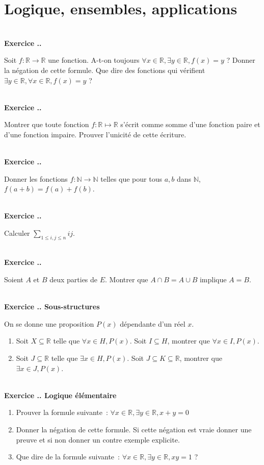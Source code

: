 \documentclass{article}
\newcommand{\mb}[1]{\mathbb{#1}}
\newcounter{exo}
\newcommand{\exercice}[1][\null]{\textbf{\\ \large Exercice \thesection.\theexo. \normalsize #1} \addtocounter{exo}{1}}
\begin{document}
\tableofcontents

\pagebreak


\section{Logique, ensembles, applications}

\exercice 

Soit $f : \mb{R} \rightarrow \mb{R}$ une fonction. A-t-on toujours $\forall x \in \mb{R}, \exists y \in \mb{R}, f(x) = y$ ? Donner la négation de cette formule. Que dire des fonctions qui vérifient $\exists y \in \mb{R}, \forall x \in \mb{R},  f(x) = y$ ?

\exercice  Montrer que toute fonction $f : \mb{R} \mapsto \mb{R}$ s'écrit comme somme d'une fonction paire et d'une fonction impaire. Prouver l'unicité de cette écriture.

\exercice Donner les fonctions $f : \mb{N} \rightarrow \mb{N}$ telles que pour tous $a,b$ dans $\mb{N}$, $f(a+b) = f(a)+f(b)$.

\exercice  Calculer $\displaystyle \sum_{1 \le i, j \le n} ij$.




\exercice

Soient $A$ et $B$ deux parties de $E$. Montrer que $A \cap B = A \cup B$ implique $A = B$.



\exercice[Sous-structures]

On se donne une proposition $P(x)$ dépendante d'un réel $x$.

\begin{enumerate}

\item Soit $X \subseteq \mb{R}$ telle que $\forall x \in H, P(x)$. Soit $I \subseteq H$, montrer que $\forall x \in I, P(x)$.

\item Soit $J \subseteq \mb{R}$ telle que $\exists x \in H, P(x)$. Soit $J \subseteq K \subseteq \mb{R}$, montrer que $\exists x \in J, P(x)$.
\end{enumerate}

\exercice[Logique élémentaire]

\begin{enumerate}
    \item Prouver la formule suivante~: $\forall x \in \mathbb{R}, \exists y \in
        \mathbb{R}, x + y = 0$

    \item Donner la négation de cette formule. Si cette négation est vraie
        donner une preuve et si non donner un contre exemple explicite.

    \item Que dire de la formule suivante~: $\forall x \in \mathbb{R}, \exists y \in
        \mathbb{R}, xy = 1$ ?
\end{enumerate}
\end{document}
